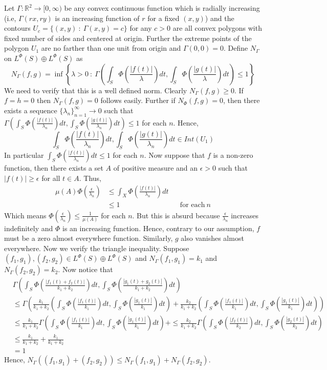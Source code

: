 \documentclass[pdflatex,sn-mathphys-num]{sn-jnl}%
\theoremstyle{thmstyleone}%
\theoremstyle{thmstyletwo}%
\theoremstyle{thmstylethree}%
\begin{document}
Let $\Gamma:\mathbb R^2\to [0,\infty)$ be any convex continuous function which is radially increasing (i.e, $\Gamma(rx,ry)$ is an increasing function of $r$ for a fixed $(x,y)$) and the contours $U_c=\{(x,y)~:~\Gamma(x,y)=c\}$ for any $c>0$ are all convex polygons with fixed number of sides and centered at origin. Further the extreme points of the polygon $U_1$ are no farther than one unit from origin and $\Gamma(0,0)=0$. Define $N_{\Gamma}$ on $L^\Phi(S)\oplus L^\Phi(S)$ as 
$$N_\Gamma(f,g)=\inf\left\{\lambda>0~:~\Gamma\left(\int_S\Phi\left(\frac{|f(t)|}{\lambda}\right)dt, \int_S\Phi\left(\frac{|g(t)|}{\lambda}\right)dt\right)\leq 1\right\}$$
We need to verify that this is a well defined norm. Clearly $N_\Gamma(f,g)\geq 0 $. If $f=h=0$ then $N_\Gamma(f,g)=0$ follows easily. Further if $N_\Phi(f,g)=0$, then there exists a sequence $\{\lambda_n\}_{n=1}^\infty \to 0$ such that $\Gamma\left(\int_S\Phi\left(\frac{|f(t)|}{\lambda_n}\right)dt, \int_S\Phi\left(\frac{|g(t)|}{\lambda_n}\right)dt\right)\leq 1$ for each $n$. Hence, $$\int_S\Phi\left(\frac{|f(t)|}{\lambda_n}\right)dt,\int_S\Phi\left(\frac{|g(t)|}{\lambda_n}\right)dt\in Int(U_1)$$
In particular $\int_S\Phi\left(\frac{|f(t)|}{\lambda_n}\right)dt\leq 1$ for each $n$. Now suppose that $f$ is a non-zero function, then there exists a set $A$ of positive measure and an $\epsilon>0$ such that $|f(t)|\geq \epsilon$ for all $t\in A$. Thus,
\begin{align*}
	\mu(A)\Phi\left(\frac{\epsilon}{\lambda_n}\right)&\leq \int_X\Phi\left(\frac{|f(t)|}{\lambda_n}\right)dt\\&\leq 1&&\text{for each}~n
	\end{align*}
Which means $\Phi(\frac{\epsilon}{\lambda_n})\leq \frac{1}{\mu(A)}$ for each $n$. But this is absurd because $\frac{\epsilon}{\lambda_n}$ increases indefinitely and $\Phi$ is an increasing function. Hence, contrary to our assumption, $f$ must be a zero almost everywhere function. Similarly, $g$ also vanishes almost everywhere. Now we verify the triangle inequality. Suppose $(f_1,g_1), (f_2,g_2)\in L^\Phi(S)\oplus L^\Phi(S)$ and $N_\Gamma(f_1,g_1)=k_1$ and $N_\Gamma(f_2,g_2)=k_2$. Now notice that 
\begin{align*}
&\Gamma\left(\int_S\Phi\left(\frac{|f_1(t)+f_2(t)|}{k_1+k_2}\right)dt,\int_S\Phi\left(\frac{|g_1(t)+g_2(t)|}{k_1+k_2}\right)dt\right)\\&\leq \Gamma\left(\frac{k_1}{k_1+k_2}\left(\int_S\Phi\left(\frac{|f_1(t)|}{k_1}\right)dt,\int_S\Phi\left(\frac{|g_1(t)|}{k_1}\right)dt\right)+\frac{k_2}{k_1+k_2}\left(\int_S\Phi\left(\frac{|f_1(t)|}{k_1}\right)dt,\int_S\Phi\left(\frac{|g_1(t)|}{k_1}\right)dt\right)\right)\\&\leq \frac{k_1}{k_1+k_2}\Gamma\left(\int_S\Phi\left(\frac{|f_1(t)|}{k_1}\right)dt,\int_S\Phi\left(\frac{|g_1(t)|}{k_1}\right)dt\right)+\leq \frac{k_2}{k_1+k_2}\Gamma\left(\int_S\Phi\left(\frac{|f_2(t)|}{k_2}\right)dt,\int_S\Phi\left(\frac{|g_2(t)|}{k_2}\right)dt\right)\\&\leq \frac{k_1}{k_1+k_2}+\frac{k_1}{k_1+k_2}\\&=1
\end{align*}
Hence, $N_\Gamma((f_1,g_1)+(f_2,g_2))\leq N_\Gamma(f_1,g_1)+N_\Gamma(f_2,g_2)$.
\end{document}
